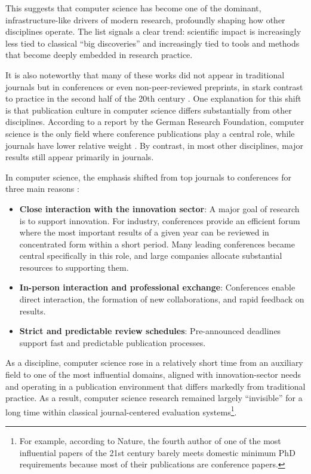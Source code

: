 \documentclass[12pt,a4paper]{article}
\begin{document}
This suggests that computer science has become one of the dominant, infrastructure-like drivers of modern research, profoundly shaping how other disciplines operate. The list signals a clear trend: scientific impact is increasingly less tied to classical ``big discoveries'' and increasingly tied to tools and methods that become deeply embedded in research practice.

%

It is also noteworthy that many of these works did not appear in traditional journals but in conferences or even non-peer-reviewed preprints, in stark contrast to practice in the second half of the 20th century \cite{ioannidis2006concentration}. One explanation for this shift is that publication culture in computer science differs substantially from other disciplines. According to a report by the German Research Foundation, computer science is the only field where conference publications play a central role, while journals have lower relative weight \cite[Figure 3]{DFG2022Publishing}. By contrast, in most other disciplines, major results still appear primarily in journals. %

In computer science, the emphasis shifted from top journals to conferences for three main reasons \cite{vrettas2015conferences,laender2008assessing}:
\begin{itemize}
\item \textbf{Close interaction with the innovation sector}: A major goal of research is to support innovation. For industry, conferences provide an efficient forum where the most important results of a given year can be reviewed in concentrated form within a short period. Many leading conferences became central specifically in this role, and large companies allocate substantial resources to supporting them.
\item \textbf{In-person interaction and professional exchange}: Conferences enable direct interaction, the formation of new collaborations, and rapid feedback on results.
\item \textbf{Strict and predictable review schedules}: Pre-announced deadlines support fast and predictable publication processes.
\end{itemize}

As a discipline, computer science rose in a relatively short time from an auxiliary field to one of the most influential domains, aligned with innovation-sector needs and operating in a publication environment that differs markedly from traditional practice. As a result, computer science research remained largely ``invisible'' for a long time within classical journal-centered evaluation systems\footnote{For example, according to Nature, the fourth author of one of the most influential papers of the 21st century barely meets domestic minimum PhD requirements because most of their publications are conference papers.}.
\end{document}
